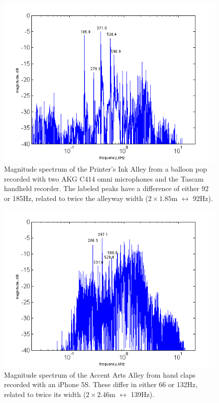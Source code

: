 \documentclass{aes137}
\begin{document}

\begin{figure}[h!] \centering \includegraphics[width=\linewidth]{images/printers_labeled_IR.png} 
\caption{Magnitude spectrum of the Printer's Ink Alley from
  a balloon pop recorded with two AKG C414 omni microphones and the Tascam handheld recorder. The labeled
  peaks have a difference of either 92 or 185Hz, related to twice the alleyway width
  ($2\times1.85$m $\longleftrightarrow$ 92Hz).}
\end{figure}

\begin{figure}[h!] \centering \includegraphics[width=\linewidth]{images/artists_labeled_IR.png} 
\caption{Magnitude spectrum of the Accent Arts Alley from hand claps
  recorded with an iPhone 5S. These differ in either 66 or 132Hz,
  related to twice its width ($2\times2.46$m $\longleftrightarrow$ 139Hz).}
\end{figure}
\end{document}
